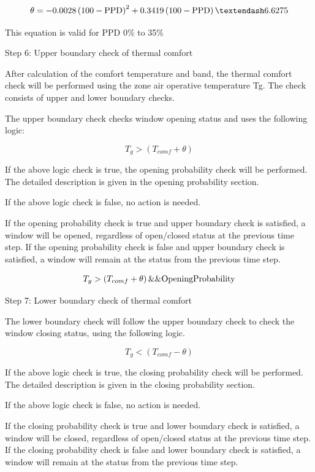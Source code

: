 \begin{equation}
\theta = -0.0028 \left(100-\rm{PPD}\right)^2 + 0.3419 \left(100-\rm{PPD}\right) – 6.6275
\end{equation}

This equation is valid for PPD 0\% to 35\%

Step 6: Upper boundary check of thermal comfort

After calculation of the comfort temperature and band, the thermal comfort check will be performed using the zone air operative temperature Tg. The check consists of upper and lower boundary checks.

The upper boundary check checks window opening status and uses the following logic:

\begin{equation}
T_g > \left(T_{comf} + \theta\right)
\end{equation}

If the above logic check is true, the opening probability check will be performed. The detailed description is given in the opening probability section.

If the above logic check is false, no action is needed.

If the opening probability check is true and upper boundary check is satisfied, a window will be opened, regardless of open/closed status at the previous time step. If the opening probability check is false and upper boundary check is satisfied, a window will remain at the status from the previous time step.

\begin{equation}
T_g > \left(T_{comf} + \theta\right) \&\& \rm{OpeningProbability}
\end{equation}

Step 7: Lower boundary check of thermal comfort

The lower boundary check will follow the upper boundary check to check the window closing status, using the following logic.

\begin{equation}
T_g < \left(T_{comf} - \theta\right)
\end{equation}

If the above logic check is true, the closing probability check will be performed. The detailed description is given in the closing probability section.

If the above logic check is false, no action is needed.

If the closing probability check is true and lower boundary check is satisfied, a window will be closed, regardless of open/closed status at the previous time step. If the closing probability check is false and lower boundary check is satisfied, a window will remain at the status from the previous time step.

